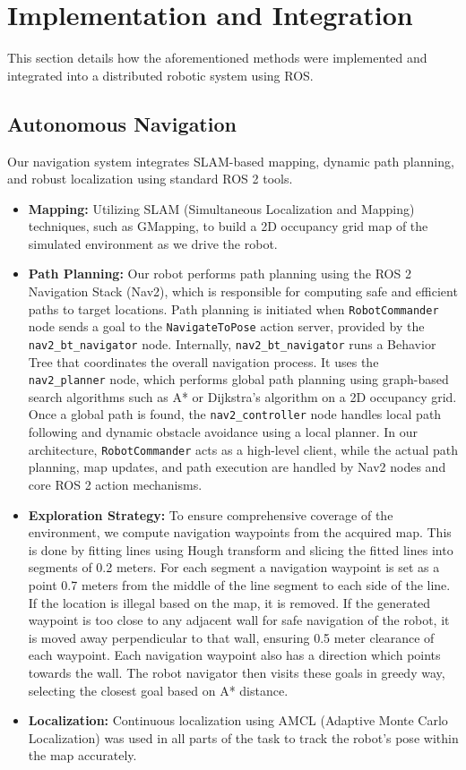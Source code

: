 \documentclass[a4paper]{article}
\begin{document}
\section{Implementation and Integration}
This section details how the aforementioned methods were implemented and integrated into a distributed robotic system using ROS.

\subsection{Autonomous Navigation}
Our navigation system integrates SLAM-based mapping, dynamic path planning, and robust localization using standard ROS 2 tools.
\begin{itemize}
    \item \textbf{Mapping:} Utilizing SLAM (Simultaneous Localization and Mapping) techniques, such as GMapping, to build a 2D occupancy grid map of the simulated environment as we drive the robot.
    \item \textbf{Path Planning:} Our robot performs path planning using the ROS 2 Navigation Stack (Nav2), which is responsible for computing safe and efficient paths to target locations. Path planning is initiated when \texttt{RobotCommander} node sends a goal to the \texttt{NavigateToPose} action server, provided by the \texttt{nav2\_bt\_navigator} node. Internally, \texttt{nav2\_bt\_navigator} runs a Behavior Tree that coordinates the overall navigation process. It uses the \texttt{nav2\_planner} node, which performs global path planning using graph-based search algorithms such as A* or Dijkstra's algorithm on a 2D occupancy grid. Once a global path is found, the \texttt{nav2\_controller} node handles local path following and dynamic obstacle avoidance using a local planner. In our architecture, \texttt{RobotCommander} acts as a high-level client, while the actual path planning, map updates, and path execution are handled by Nav2 nodes and core ROS 2 action mechanisms. 
    \item \textbf{Exploration Strategy:} To ensure comprehensive coverage of the environment, we compute navigation waypoints from the acquired map. This is done by fitting lines using Hough transform and slicing the fitted lines into segments of 0.2 meters. For each segment a navigation waypoint is set as a point 0.7 meters from the middle of the line segment to each side of the line. If the location is illegal based on the map, it is removed. If the generated waypoint is too close to any adjacent wall for safe navigation of the robot, it is moved away perpendicular to that wall, ensuring 0.5 meter clearance of each waypoint. Each navigation waypoint also has a direction which points towards the wall. The robot navigator then visits these goals in greedy way, selecting the closest goal based on A* distance.
    \item \textbf{Localization:} Continuous localization using AMCL (Adaptive Monte Carlo Localization) was used in all parts of the task to track the robot's pose within the map accurately.
\end{itemize}
\end{document}
